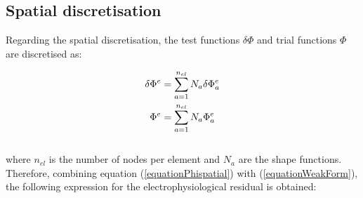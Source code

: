 \documentclass[oneside,11pt,times]{book}
\begin{document}
\subsection{Spatial discretisation}

Regarding the spatial discretisation, the test functions $\delta\Phi$ and trial functions $\Phi$ are discretised as:

\begin{equation}
\begin{aligned}
\centering
\delta\Phi^{e}&=\sum_{a=1}^{n_{el}}N_{a}\delta\Phi_{a}^{e}\\
\Phi^{e}&=\sum_{a=1}^{n_{el}}N_{a}\Phi_{a}^{e}
\end{aligned}
\label{equationPhispatial}
\end{equation}
\\
where $n_{el}$ is the number of nodes per element and $N_a$ are the shape functions.\\


Therefore, combining equation (\ref{equationPhispatial}) with (\ref{equationWeakForm}), the following expression for the electrophysiological residual is obtained:

\end{document}
